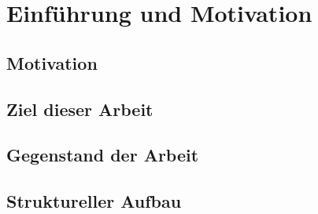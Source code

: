 \chapter{Einführung und Motivation}


\section{Motivation}
\label{sec:motivation}



\section{Ziel dieser Arbeit}


\section{Gegenstand der Arbeit}
\label{sec:gegenstand}


\section{Struktureller Aufbau}
	
	
	
